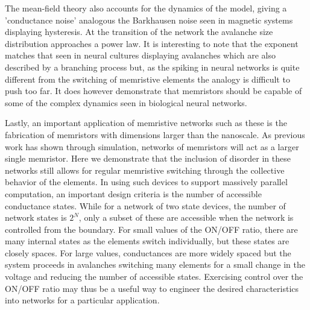 \documentclass[aps,prl,reprint,groupedaddress]{revtex4-1}
\begin{document}
The mean-field theory also accounts for the dynamics of the model, giving
a 'conductance noise' analogous the Barkhausen noise seen in magnetic systems
displaying hysteresis.  At the transition of the network the avalanche
size distribution approaches a power law.  It is interesting to note that
the exponent matches that seen in neural cultures displaying avalanches which
are also described by a branching process but, as the spiking in neural
networks is quite different from the switching of memristive elements the
analogy is difficult to push too far.  It does however demonstrate that
memristors should be capable of some of the complex dynamics seen in biological
neural networks.

Lastly, an important application of memristive networks such as these is the
fabrication of memristors with dimensions larger than the nanoscale. As
previous work has shown through simulation, networks of memristors will act
as a larger single memristor.  Here we demonstrate that the inclusion of
disorder in these networks still allows for regular memristive switching
through the collective behavior of the elements.  In using such devices to
support massively parallel computation, an important design criteria is the
number of accessible conductance states.  While for a network of two state
devices, the number of network states is $2^N$, only a subset of these are
accessible when the network is controlled from the boundary. For small values
of the ON/OFF ratio, there are many internal states as the elements
switch individually, but these states are closely spaces.  For large values,
conductances are more widely spaced but the system proceeds in avalanches
switching many elements for a small change in the voltage and reducing the
number of accessible states.  Exercising control over the ON/OFF ratio may
thus be a useful way to engineer the desired characteristics into networks
for a particular application.


%
\end{document}
